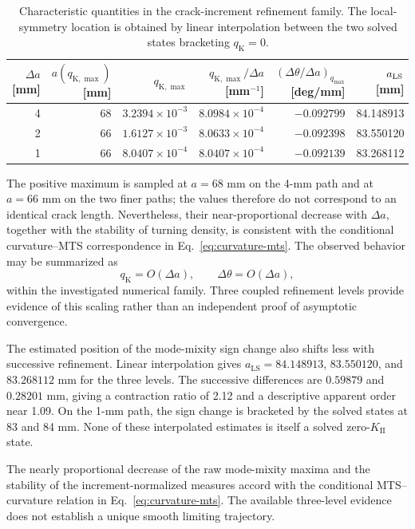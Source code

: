 \documentclass[11pt]{article}
\begin{document}
\begin{table}[tbp]
\centering
\small
\setlength{\tabcolsep}{3.6pt}
\caption{Characteristic quantities in the crack-increment refinement
family. The local-symmetry location is obtained by linear interpolation
between the two solved states bracketing $q_{\mathrm{K}}=0$.}
\label{tab:increment-characteristic}
\begin{tabular}{rrrrrr}
\toprule
$\Delta a$ [mm] &
$a(q_{\mathrm{K},\max})$ [mm] &
$q_{\mathrm{K},\max}$ &
$q_{\mathrm{K},\max}/\Delta a$ [mm$^{-1}$] &
$(\Delta\theta/\Delta a)_{q_{\max}}$ [deg/mm] &
$a_{\rm LS}$ [mm]\\
\midrule
4 & 68 & $3.2394\times10^{-3}$ & $8.0984\times10^{-4}$ &
$-0.092799$ & 84.148913\\
2 & 66 & $1.6127\times10^{-3}$ & $8.0633\times10^{-4}$ &
$-0.092398$ & 83.550120\\
1 & 66 & $8.0407\times10^{-4}$ & $8.0407\times10^{-4}$ &
$-0.092139$ & 83.268112\\
\bottomrule
\end{tabular}
\end{table}

The positive maximum is sampled at $a=68$ mm on the 4-mm path and
at $a=66$ mm on the two finer paths; the values therefore do not
correspond to an identical crack length. Nevertheless, their
near-proportional decrease with $\Delta a$, together with the
stability of turning density, is consistent with the conditional
curvature--MTS correspondence in Eq.~\eqref{eq:curvature-mts}.
The observed behavior may be summarized as
\begin{equation}
 q_{\mathrm{K}}=O(\Delta a),\qquad
 \Delta\theta=O(\Delta a),
 \label{eq:increment-scaling}
\end{equation}
within the investigated numerical family. Three coupled refinement
levels provide evidence of this scaling rather than an
independent proof of asymptotic convergence.

The estimated position of the mode-mixity sign change
also shifts less with successive refinement. Linear
interpolation gives $a_{\mathrm{LS}}=84.148913$,
$83.550120$, and $83.268112$ mm for the three
levels. The successive differences are $0.59879$
and $0.28201$ mm, giving a contraction ratio of
2.12 and a descriptive apparent order near 1.09.
On the 1-mm path, the sign change is bracketed by
the solved states at 83 and 84 mm. None of these
interpolated estimates is itself a solved
zero-$K_{\mathrm{II}}$ state.

The nearly proportional decrease of the raw mode-mixity
maxima and the stability of the increment-normalized
measures accord with the conditional MTS--curvature
relation in Eq.~\eqref{eq:curvature-mts}. The available
three-level evidence does not establish a unique smooth
limiting trajectory.
\end{document}
